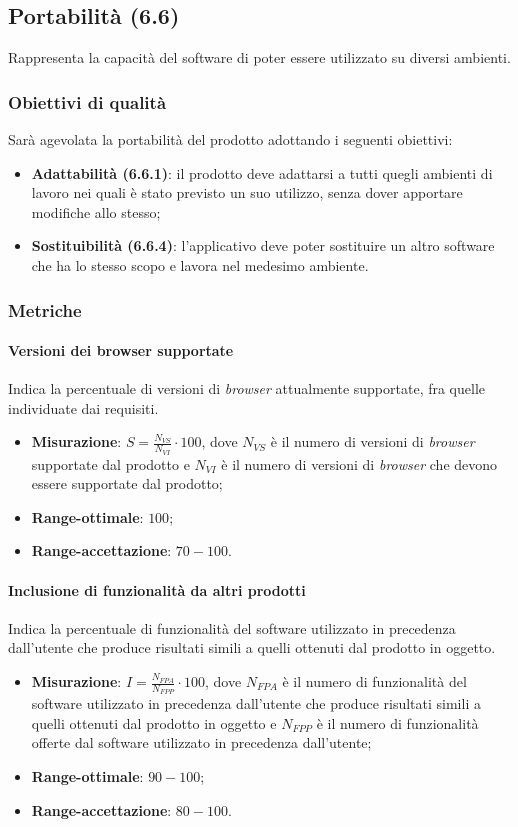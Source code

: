 \subsection{Portabilità (6.6)}
Rappresenta la capacità del software di poter essere utilizzato su diversi ambienti.
\subsubsection{Obiettivi di qualità}
Sarà agevolata la portabilità del prodotto adottando i seguenti obiettivi:
\begin{itemize}
\item \textbf{Adattabilità (6.6.1)}: il prodotto deve adattarsi a tutti quegli ambienti di lavoro nei quali è stato previsto un suo utilizzo, senza dover apportare modifiche allo stesso;
\item \textbf{Sostituibilità (6.6.4)}: l'applicativo deve poter sostituire un altro software che ha lo stesso scopo e lavora nel medesimo ambiente.
\end{itemize}
\subsubsection{Metriche}
\paragraph{Versioni dei browser supportate}
Indica la percentuale di versioni di \textit{browser} attualmente supportate, fra quelle individuate dai requisiti.
\begin{itemize}
\item \textbf{Misurazione}: $S=\frac{N_{VS}}{N_{VI}} \cdot 100$, dove $N_{VS}$ è il numero di versioni di \textit{browser} supportate dal prodotto e $N_{VI}$ è il numero di versioni di \textit{browser} che devono essere supportate dal prodotto;
\item \textbf{Range-ottimale}: $100$;
\item \textbf{Range-accettazione}: $70 - 100$.
\end{itemize}
\paragraph{Inclusione di funzionalità da altri prodotti}
Indica la percentuale di funzionalità del software utilizzato in precedenza dall'utente che produce risultati simili a quelli ottenuti dal prodotto in oggetto.
\begin{itemize}
\item \textbf{Misurazione}: $I=\frac{N_{FPA}}{N_{FPP}} \cdot 100$, dove $N_{FPA}$ è il numero di funzionalità del software utilizzato in precedenza dall'utente che produce risultati simili a quelli ottenuti dal prodotto in oggetto e $N_{FPP}$ è il numero di funzionalità offerte dal software utilizzato in precedenza dall'utente;
\item \textbf{Range-ottimale}: $90 - 100$;
\item \textbf{Range-accettazione}: $80 - 100$.
\end{itemize}